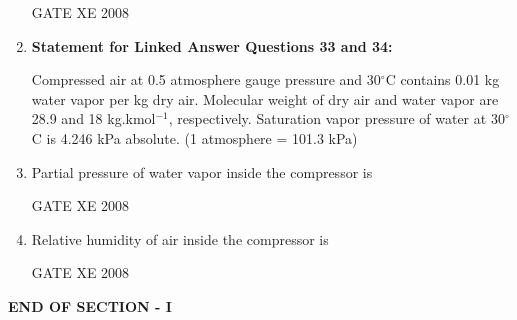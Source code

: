 \documentclass[12pt]{article}
\begin{document}
\begin{enumerate}[label=Q\arabic*.]
GATE XE 2008  

\item[] \textbf{Statement for Linked Answer Questions 33 and 34:}

Compressed air at 0.5 atmosphere gauge pressure and 30$^\circ$C contains 0.01 kg water vapor per kg dry air. Molecular weight of dry air and water vapor are 28.9 and 18 kg.kmol$^{-1}$, respectively. Saturation vapor pressure of water at 30$^\circ$C is 4.246 kPa absolute. (1 atmosphere = 101.3 kPa) \\

\item Partial pressure of water vapor inside the compressor is 

\begin{enumerate}[label=(\Alph*)]
\end{enumerate}

GATE XE 2008

\item Relative humidity of air inside the compressor is

\begin{enumerate}[label=(\Alph*)]
\end{enumerate}

GATE XE 2008

\end{enumerate}

\begin{center}
    \textbf{END OF SECTION - I}
\end{center}
\end{document}

